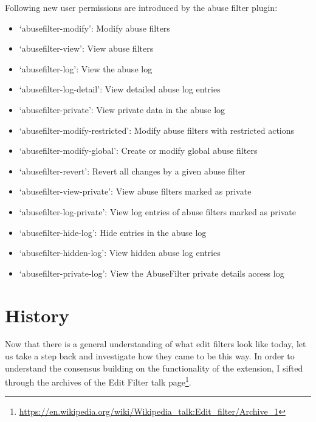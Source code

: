 Following new user permissions are introduced by the abuse filter plugin:
\begin{itemize}
    \item `abusefilter-modify': Modify abuse filters
    \item `abusefilter-view': View abuse filters
    \item `abusefilter-log': View the abuse log
    \item `abusefilter-log-detail':	View detailed abuse log entries
    \item `abusefilter-private': View private data in the abuse log
    \item `abusefilter-modify-restricted': Modify abuse filters with restricted actions
    \item `abusefilter-modify-global': Create or modify global abuse filters
    \item `abusefilter-revert':	Revert all changes by a given abuse filter
    \item `abusefilter-view-private': View abuse filters marked as private
    \item `abusefilter-log-private': View log entries of abuse filters marked as private
    \item `abusefilter-hide-log': Hide entries in the abuse log
    \item `abusefilter-hidden-log':	View hidden abuse log entries
    \item `abusefilter-private-log': View the AbuseFilter private details access log
\end{itemize}




\section{History}

Now that there is a general understanding of what edit filters look like today, let us take a step back and investigate how they came to be this way.
In order to understand the consensus building on the functionality of the extension, I sifted through the archives of the Edit Filter talk page\footnote{\url{https://en.wikipedia.org/wiki/Wikipedia_talk:Edit_filter/Archive_1}}.

